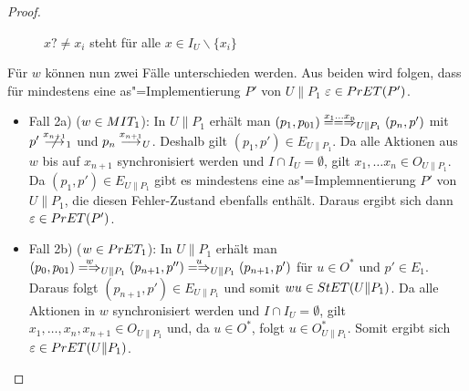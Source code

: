 \begin{proof}
\begin{itemize}
\begin{figure} [h!tbp]
\begin{center}
        \caption{$x?\neq x_i$ steht für alle $x\in I_U\backslash\{x_i\}$}
      \label{UohneE}
      \end{center}
      \end{figure}
      Für $w$ können nun zwei Fälle unterschieden werden. Aus beiden wird
      folgen, dass für mindestens eine as"=Implementierung $P'$ von $U\|P_1$
      $\varepsilon\in PrET(P')$.
      \begin{itemize}
        \item Fall 2a) ($w\in MIT _1$): In $U\|P_1$ erhält man $(p_1,p_{01})
          \lweakmay[x_1\dots x_n]_{U\|P_1} (p_n,p')$ mit $p'\nmust[x_{n+1}]_1$
          und $p_n\must[x_{n+1}]_U$. Deshalb gilt $(p_1,p')\in E_{U\|P_1}$. Da
          alle Aktionen aus $w$ bis auf $x_{n+1}$ synchronisiert werden und
          $I\cap I_U=\emptyset$, gilt $x_1,\dots x_n\in O_{U\|P_1}$. Da
          $(p_1,p')\in E_{U\|P_1}$ gibt es mindestens eine as"=Implemnentierung
          $P'$ von $U\|P_1$, die diesen Fehler-Zustand ebenfalls enthält.
          Daraus ergibt sich dann $\varepsilon\in PrET (P')$.
        \item Fall 2b) ($w\in PrET _1$): In $U\|P_1$ erhält man $(p_0,p_{01})
          \weakmay[w]_{U\|P_1}(p_{n+1},p'')\weakmay[u]_{U\|P_1}(p_{n+1},p')$
          für $u\in O^*$ und $p'\in E_1$. Daraus folgt $(p_{n+1},p')\in
          E_{U\|P_1}$ und somit $wu\in StET (U\|P_1)$. Da alle Aktionen in $w$
          synchronisiert werden und $I\cap I_U=\emptyset$, gilt $x_1,\dots
          ,x_n,x_{n+1}\in O_{U\|P_1}$ und, da $u\in O^*$, folgt $u\in
          O_{U\|P_1}^*$. Somit ergibt sich $\varepsilon\in PrET (U\|P_1)$.

\end{itemize}
\end{itemize}
\end{proof}
